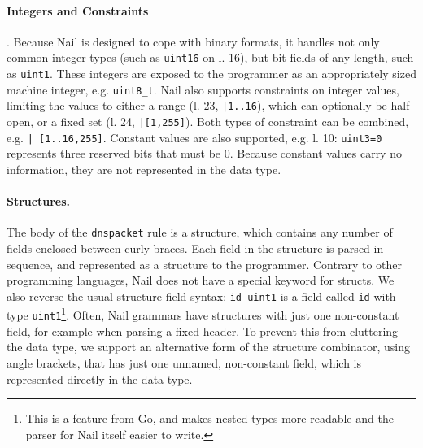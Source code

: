 \paragraph{Integers and Constraints}.
Because Nail is designed to cope with binary formats,
it handles not only common integer types (such as \texttt{uint16} on l. 16), but bit fields of any
length, such as \texttt{uint1}. These integers are exposed to the programmer as an appropriately
sized machine integer, e.g. \texttt{uint8\_t}. Nail also supports constraints on integer values,
limiting the values to either a range (l. 23, \texttt{|1..16}), which can optionally be half-open,
or a fixed set (l. 24, \texttt{|[1,255]}). Both types of constraint can be combined, e.g. \texttt{|
  [1..16,255]}. Constant values are also supported, e.g. l. 10: \texttt{uint3=0} represents
three reserved bits that must be 0. Because constant values carry no information, they are not
represented in the data type.

\paragraph{Structures.}

The body of the \texttt{dnspacket} rule is a structure, which contains any number of fields enclosed
between  curly braces. Each field in the structure is parsed in sequence, and represented as a
structure to the programmer.  Contrary to other programming languages, Nail does not have a special
keyword for structs. We also reverse the usual structure-field syntax: \texttt{id uint1} is a field
called \texttt{id} with type \texttt{uint1}\footnote{This is a feature from Go, and makes nested
  types more readable and the parser for Nail itself easier to write.}. Often, Nail grammars have
structures with just one non-constant field, for example when parsing a fixed header. To prevent
this from cluttering the data type, we support an alternative form of the structure combinator,
using angle brackets, that has just one unnamed, non-constant field, which is represented directly
in the data type. 





